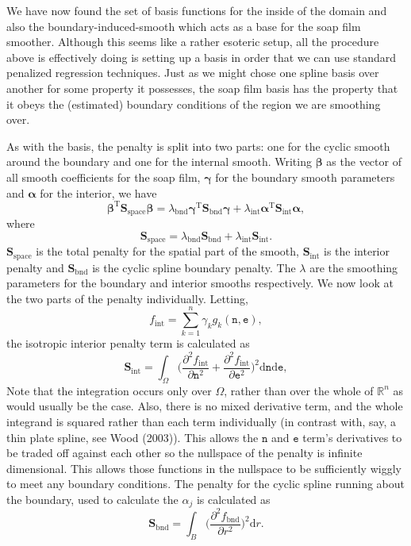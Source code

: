 \documentclass[10pt] {article}
\newcommand{\beq}{\begin{equation}}
\newcommand{\eeq}{\end{equation}}
\theoremstyle{definition}
\theoremstyle{plain}
\begin{document}
We have now found the set of basis functions for the inside of the domain and also the boundary-induced-smooth which acts as a base for the soap film smoother. Although this seems like a rather esoteric setup, all the procedure above is effectively doing is setting up a basis in order that we can use standard penalized regression techniques. Just as we might chose one spline basis over another for some property it possesses,  the soap film basis has the property that it obeys the (estimated) boundary conditions of the region we are smoothing over.

As with the basis, the penalty is split into two parts: one for the cyclic smooth around the boundary and one for the internal smooth. Writing $\bm\beta$ as the vector of all smooth coefficients for the soap film, $\bm\gamma$ for the boundary smooth parameters and $\bm\alpha$ for the interior, we have
$$
\bm\beta^\text{T}\textbf{S}_\text{space}\bm{\beta} = \lambda_\text{bnd} \bm\gamma^\text{T}\textbf{S}_\text{bnd}\bm{\gamma} + \lambda_\text{int} \bm{\alpha}^\text{T}\textbf{S}_\text{int}\bm{\alpha},
$$
where 
$$
\textbf{S}_\text{space} = \lambda_\text{bnd} \textbf{S}_\text{bnd} + \lambda_\text{int} \textbf{S}_\text{int}.
$$
$\textbf{S}_\text{space}$ is the total penalty for the spatial part of the smooth, $\textbf{S}_\text{int}$ is the interior penalty and $\textbf{S}_\text{bnd}$ is the cyclic spline boundary penalty. The $\lambda$ are the smoothing parameters for the boundary and interior smooths respectively. We now look at the two parts of the penalty individually. Letting,
$$
f_\text{int}=\sum_{k=1}^n \gamma_k g_k(\texttt{n},\texttt{e}),
$$
the isotropic interior penalty term is calculated as
$$
\textbf{S}_\text{int} = \int_\Omega \Big(\frac{\partial^2 f_\text{int}}{\partial \texttt{n}^2}+\frac{\partial^2 f_\text{int}}{\partial \texttt{e}^2} 
\Big)^2\text{d}\texttt{n}\text{d}\texttt{e},
$$
Note that the integration occurs only over $\Omega$, rather than over the whole of $\mathbb{R}^n$ as would usually be the case. Also, there is no mixed derivative term, and the whole integrand is squared rather than each term individually (in contrast with, say, a thin plate spline, see Wood (2003)). This allows the $\texttt{n}$ and $\texttt{e}$ term's derivatives to be traded off against each other so the nullspace of the penalty is infinite dimensional. This allows those functions in the nullspace to be sufficiently wiggly to meet any boundary conditions. The penalty for the cyclic spline running about the boundary, used to calculate the $\alpha_j$ is calculated as
\beq
\textbf{S}_\text{bnd} = \int_B \Big(\frac{\partial^2 f_\text{bnd}}{\partial r^2}\Big)^2 \text{d}r.
\eeq
\end{document}

